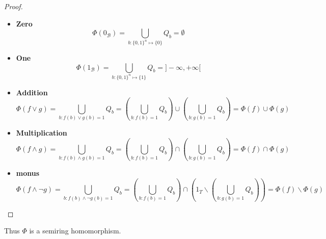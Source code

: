 \begin{proof}
\begin{itemize}
\item \textbf{Zero}
$$
\Phi(0_{\mathcal{B}}) = \bigcup_{b:\{0,1\}^n \mapsto \{0\}} Q_b = \emptyset
$$

\item
\textbf{One}
$$
\Phi(1_{\mathcal{B}}) = \bigcup_{b:\{0,1\}^n \mapsto \{1\}} Q_b = ]-\infty, +\infty[
$$
\item
\textbf{Addition}
$$
\Phi(f \lor g)
= \bigcup_{b: f(b) \lor g(b) = 1} Q_b
= \left(\bigcup_{b: f(b) = 1} Q_b\right) \cup \left(\bigcup_{b: g(b) = 1} Q_b\right)
= \Phi(f) \cup \Phi(g)
$$
\item
\textbf{Multiplication}
$$
\Phi(f \land g)
= \bigcup_{b: f(b) \land g(b) = 1} Q_b
= \left(\bigcup_{b: f(b) = 1} Q_b\right) \cap \left(\bigcup_{b: g(b) = 1} Q_b\right)
= \Phi(f) \cap \Phi(g)
$$
\item
\textbf{monus}
$$
\Phi(f \land \neg g)
= \bigcup_{b: f(b) \land \neg g(b) = 1} Q_b
= \left(\bigcup_{b: f(b) = 1} Q_b\right) \cap \left(1_T \backslash \left(\bigcup_{b: g(b) = 1} Q_b\right)\right)
= \Phi(f) \backslash \Phi(g)
$$
    

\end{itemize}

\end{proof}

Thus $\Phi$ is a semiring homomorphism.



